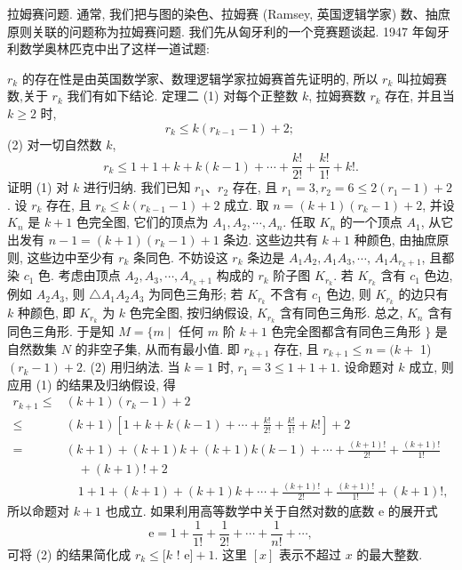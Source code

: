 
拉姆赛问题.
通常, 我们把与图的染色、拉姆赛 (Ramsey, 英国逻辑学家) 数、抽庶原则关联的问题称为拉姆赛问题.
我们先从匈牙利的一个竞赛题谈起.
1947 年匈牙利数学奥林匹克中出了这样一道试题:



$r_k$ 的存在性是由英国数学家、数理逻辑学家拉姆赛首先证明的, 所以 $r_k$ 叫拉姆赛数,关于 $r_k$ 我们有如下结论.
定理二 (1) 对每个正整数 $k$, 拉姆赛数 $r_k$ 存在, 并且当 $k \geqslant 2$ 时,
$$
r_k \leqslant k\left(r_{k-1}-1\right)+2 \text {; }
$$
(2) 对一切自然数 $k$,
$$
r_k \leqslant 1+1+k+k(k-1)+\cdots+\frac{k !}{2 !}+\frac{k !}{1 !}+k ! .
$$
证明 (1) 对 $k$ 进行归纳.
我们已知 $r_1 、 r_2$ 存在, 且 $r_1=3, r_2=6 \leqslant2\left(r_1-1\right)+2$.
设 $r_k$ 存在, 且 $r_k \leqslant k\left(r_{k-1}-1\right)+2$ 成立.
取 $n=(k+1)\left(r_k-1\right)+2$, 并设 $K_n$ 是 $k+1$ 色完全图, 它们的顶点为 $A_1, A_2, \cdots, A_n$. 任取 $K_n$ 的一个顶点 $A_1$, 从它出发有 $n-1=(k+1)\left(r_k-1\right)+1$ 条边.
这些边共有 $k+1$ 种颜色, 由抽庶原则, 这些边中至少有 $r_k$ 条同色.
不妨设这 $r_k$ 条边是 $A_1 A_2, A_1 A_3, \cdots$, $A_1 A_{r_k+1}$, 且都染 $c_1$ 色.
考虑由顶点 $A_2, A_3, \cdots, A_{r_k+1}$ 构成的 $r_k$ 阶子图 $K_{r_k}$. 若 $K_{r_k}$ 含有 $c_1$ 色边, 例如 $A_2 A_3$, 则 $\triangle A_1 A_2 A_3$ 为同色三角形; 若 $K_{r_k}$ 不含有 $c_1$ 色边, 则 $K_{r_k}$ 的边只有 $k$ 种颜色, 即 $K_{r_k}$ 为 $k$ 色完全图, 按归纳假设, $K_{r_k}$ 含有同色三角形.
总之, $K_n$ 含有同色三角形.
于是知
$M=\{m \mid$ 任何 $m$ 阶 $k+1$ 色完全图都含有同色三角形 $\}$
是自然数集 $N$ 的非空子集, 从而有最小值.
即 $r_{k+1}$ 存在, 且 $r_{k+1} \leqslant n=(k+$ 1) $\left(r_k-1\right)+2$.
(2) 用归纳法.
当 $k=1$ 时, $r_1=3 \leqslant 1+1+1$. 设命题对 $k$ 成立, 则应用 (1) 的结果及归纳假设, 得
$$
\begin{aligned}
r_{k+1} \leqslant & (k+1)\left(r_k-1\right)+2 \\
\leqslant & (k+1)\left[1+k+k(k-1)+\cdots+\frac{k !}{2 !}+\frac{k !}{1 !}+k !\right]+2 \\
= & (k+1)+(k+1) k+(k+1) k(k-1)+\cdots+\frac{(k+1) !}{2 !}+\frac{(k+1) !}{1 !} \\
& \quad+(k+1) !+2 \\
& \quad 1+1+(k+1)+(k+1) k+\cdots+\frac{(k+1) !}{2 !}+\frac{(k+1) !}{1 !}+(k+1) !,
\end{aligned}
$$
所以命题对 $k+1$ 也成立.
如果利用高等数学中关于自然对数的底数 $\mathrm{e}$ 的展开式
$$
\mathrm{e}=1+\frac{1}{1 !}+\frac{1}{2 !}+\cdots+\frac{1}{n !}+\cdots,
$$
可将 (2) 的结果简化成 $r_k \leqslant[k$ ! $\mathrm{e}]+1$. 这里 $[x]$ 表示不超过 $x$ 的最大整数.
